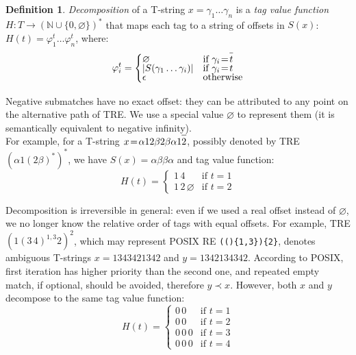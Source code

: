 \documentclass{article}
\newcommand{\Xeq}{\!=\!}
\newcommand{\YN}{\mathbb{N}}
\newcommand*{\Xbar}[1]{\overline{#1\vphantom{\bar{#1}}}}
\theoremstyle{definition}
\newtheorem{Xdef}{Definition}
\begin{document}
\begin{multicols}{2}
    \begin{Xdef}\label{tagvalfun}
    \emph{Decomposition} of a T-string $x \Xeq \gamma_1 \dots \gamma_n$
    is a \emph{tag value function} $H: T \rightarrow (\YN \cup \{ 0, \varnothing \})^*$
    that maps each tag to a string of offsets in $S(x)$:
    $H(t) \Xeq \varphi^t_1 \dots \varphi^t_n$, where:
    $$\varphi^t_i = \begin{cases}
            \varnothing &\text{if } \gamma_i \Xeq \Xbar{t} \\[-0.5em]
            |S(\gamma_1 \dots \gamma_i)| &\text{if } \gamma_i \Xeq t \\[-0.5em]
            \epsilon &\text{otherwise}
        \end{cases}$$
    \end{Xdef}

Negative submatches have no exact offset: they can be attributed to any point on the alternative path of TRE.
We use a special value $\varnothing$ to represent them
(it is semantically equivalent to negative infinity).
\\

For example, for a T-string $x \Xeq \alpha 1 2 \beta 2 \beta \alpha 1 \Xbar{2}$,
possibly denoted by TRE $(\alpha 1 (2 \beta)^*)^*$, we have
$S(x) \Xeq \alpha \beta \beta \alpha$ and tag value function:
    $$H(t) \Xeq \begin{cases}
        1 \, 4 &\text{if } t \Xeq 1 \\[-0.5em]
        1 \, 2 \, \varnothing &\text{if } t \Xeq 2
    \end{cases}$$

Decomposition is irreversible in general:
even if we used a real offset instead of $\varnothing$, we no longer know the relative order of tags with equal offsets.
For example, TRE $(1 (3 \, 4)^{1,3} 2)^{2}$,
which may represent POSIX RE \texttt{(()\{1,3\})\{2\}},
denotes ambiguous T-strings $x \Xeq 1 3 4 3 4 2 1 3 4 2$ and $y \Xeq 1 3 4 2 1 3 4 3 4 2$.
According to POSIX, first iteration has higher priority than the second one,
and repeated empty match, if optional, should be avoided, therefore $y \prec x$.
However, both $x$ and $y$ decompose to the same tag value function:
    $$H(t) \Xeq \begin{cases}
        0 \, 0 &\text{if } t \Xeq 1 \\[-0.5em]
        0 \, 0 &\text{if } t \Xeq 2 \\[-0.5em]
        0 \, 0 \, 0 &\text{if } t \Xeq 3\\[-0.5em]
        0 \, 0 \, 0 &\text{if } t \Xeq 4
    \end{cases}$$


\end{multicols}
\end{document}
